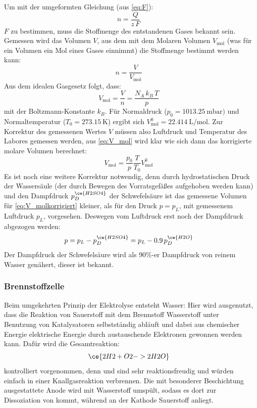 Um mit der umgeformten Gleichung (aus \cref{eq:F}):
\begin{equation}
    n=\frac{Q}{z\,F}
    \label{eq:n1}
\end{equation}
\(F\) zu bestimmen, muss die Stoffmenge des entstandenen Gases bekannt sein. Gemessen wird das Volumen \(V\), aus dem mit dem Molaren Volumen \(V_{\text{mol}}\) (was für ein Volumen ein Mol eines Gases einnimmt) die Stoffmenge bestimmt werden kann:
\begin{equation}
    n=\frac{V}{V_{\text{mol}}}
    \label{eq:n2}
\end{equation}
Aus dem idealen Gasgesetz folgt, dass:
\begin{equation}
    V_{\text{mol}}=\frac{V}{n}=\frac{N_A\,k_B\,T}{p}
    \label{eq:V_mol}
\end{equation}
mit der Boltzmann-Konstante \(k_B\). Für Normaldruck (\(p_0=\qty{1013.25}{\milli\bar})\) und Normaltemperatur (\(T_0=\qty{273.15}{\kelvin}\)) ergibt sich \(V_{\text{mol}}^0=\qty{22.414}{\liter\per\mole}\). Zur Korrektur des gemessenen Wertes \(V\) müssen also Luftdruck und Temperatur des Labores gemessen werden, aus \cref{eq:V_mol} wird klar wie sich dann das korrigierte molare Volumen berechnet:
\begin{equation}
    V_{\text{mol}}=\frac{p_0}{p}\frac{T}{T_0} V_{\text{mol}}^0
    \label{eq:V_molkorrigiert}
\end{equation}
Es ist noch eine weitere Korrektur notwendig, denn durch hydrostatischen Druck der Wassersäule (der durch Bewegen des Vorratsgefäßes aufgehoben werden kann) und den Dampfdruck \(p_D^{\ce{H2SO4}}\) der Schwefelsäure ist das gemessene Volumen für \cref{eq:V_molkorrigiert} kleiner, als für den Druck \(p=p_L\), mit gemessenem Luftdruck \(p_L\), vorgesehen. Deswegen vom Luftdruck erst noch der Dampfdruck abgezogen werden:
\begin{equation}
    p=p_L-p_D^{\ce{H2SO4}}=p_L-0.9\,p_D^{\ce{H2O}}
    \label{eq:p}
\end{equation}
Der Dampfdruck der Schwefelsäure wird als 90\%-er Dampfdruck von reinem Wasser genähert, dieser ist bekannt.

\subsubsection{Brennstoffzelle}
Beim umgekehrten Prinzip der Elektrolyse entsteht Wasser: Hier wird ausgenutzt, dass die Reaktion von Sauerstoff mit dem Brennstoff Wasserstoff unter Benutzung von Katalysatoren selbstständig abläuft und dabei aus chemischer Energie elektrische Energie durch austauschende Elektronen gewonnen werden kann. Dafür wird die Gesamtreaktion:
\begin{equation}
    \ce{2H2 + O2 -> 2H2O}
\end{equation} kontrolliert vorgenommen, denn  und  sind sehr reaktionsfreudig und würden einfach in einer Knallgasreaktion verbrennen. Die mit besonderer Beschichtung ausgestattete Anode wird mit Wasserstoff umspült, sodass es dort zur Dissoziation von  kommt, während an der Kathode Sauerstoff anliegt.

